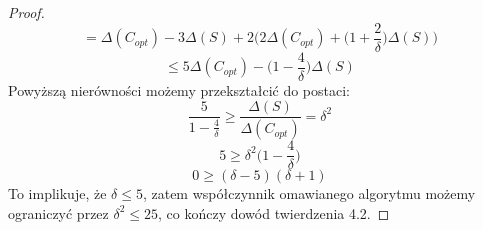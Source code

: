 \begin{proof}
\begin{equation}
        = \Delta(C_{opt}) - 3\Delta(S) + 2\Big(2\Delta(C_{opt}) + \Big(1 + \frac{2}{\delta} \Big)\Delta(S)\Big)
    \end{equation}
    \begin{equation}
        \leq 5\Delta(C_{opt}) - \Big(1 - \frac{4}{\delta} \Big)\Delta(S)
    \end{equation}
    Powyższą nierówności możemy przekształcić do postaci:
    \begin{equation}
        \frac{5}{1-\frac{4}{\delta}} \geq \frac{\Delta(S)}{\Delta(C_{opt})} = \delta^{2}
    \end{equation}
    \begin{equation}
        5 \geq \delta^{2} \Big(1 - \frac{4}{\delta} \Big)
    \end{equation}
    \begin{equation}
        0 \geq (\delta - 5)(\delta + 1)
    \end{equation}
    To implikuje, że $\delta \leq 5$, zatem współczynnik omawianego algorytmu możemy ograniczyć przez $\delta^{2} \leq 25$, co kończy dowód twierdzenia 4.2.
\end{proof}